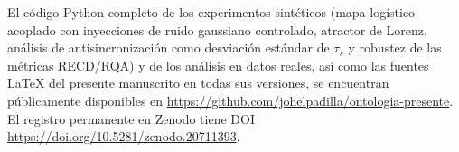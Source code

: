 El código Python completo de los experimentos sintéticos (mapa logístico acoplado con inyecciones de ruido gaussiano controlado, atractor de Lorenz, análisis de antisincronización como desviación estándar de $\tau_s$ y robustez de las métricas RECD/RQA) y de los análisis en datos reales, así como las fuentes LaTeX del presente manuscrito en todas sus versiones, se encuentran públicamente disponibles en \url{https://github.com/johelpadilla/ontologia-presente}. El registro permanente en Zenodo tiene DOI \url{https://doi.org/10.5281/zenodo.20711393}.